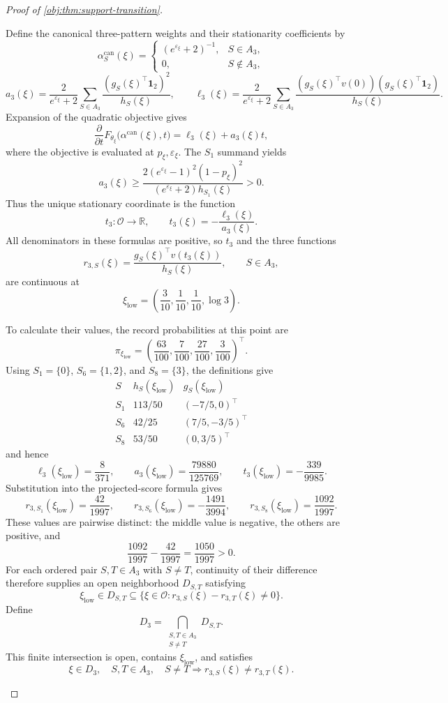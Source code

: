\begin{proof}[Proof of \cref{obj:thm:support-transition}]
\begin{enumerate}
Define the canonical three-pattern weights and their stationarity coefficients by
\[
\alpha^{\mathrm{can}}_S(\xi)=
\begin{cases}
(e^{\varepsilon_\xi}+2)^{-1},&S\in A_3,\\
0,&S\notin A_3,
\end{cases}
\]
\[
a_3(\xi)=\frac{2}{e^{\varepsilon_\xi}+2}
 \sum_{S\in A_3}\frac{(g_S(\xi)^\top\mathbf1_2)^2}{h_S(\xi)},
\qquad
\ell_3(\xi)=\frac{2}{e^{\varepsilon_\xi}+2}
 \sum_{S\in A_3}
 \frac{(g_S(\xi)^\top v(0))(g_S(\xi)^\top\mathbf1_2)}{h_S(\xi)}.
\]
Expansion of the quadratic objective gives
\[
\frac{\partial}{\partial t}
F_{\theta_\xi}\bigl(\alpha^{\mathrm{can}}(\xi),t\bigr)
=\ell_3(\xi)+a_3(\xi)t,
\]
where the objective is evaluated at \(p_\xi,\varepsilon_\xi\). The \(S_1\) summand yields
\[
a_3(\xi)\ge
\frac{2(e^{\varepsilon_\xi}-1)^2(1-p_\xi)^2}
 {(e^{\varepsilon_\xi}+2)h_{S_1}(\xi)}>0.
\]
Thus the unique stationary coordinate is the function
\[
t_3:\mathcal O\longrightarrow\mathbb R,
\qquad
t_3(\xi)=-\frac{\ell_3(\xi)}{a_3(\xi)}.
\]
All denominators in these formulas are positive, so \(t_3\) and the three functions
\[
r_{3,S}(\xi)=
\frac{g_S(\xi)^\top v(t_3(\xi))}{h_S(\xi)},
\qquad S\in A_3,
\]
are continuous at
\[
\xi_{\mathrm{low}}
=\left(\frac3{10},\frac1{10},\frac1{10},\log 3\right).
\]

To calculate their values, the record probabilities at this point are
\[
\pi_{\xi_{\mathrm{low}}}
=\left(\frac{63}{100},\frac7{100},\frac{27}{100},\frac3{100}\right)^\top.
\]
Using \(S_1=\{0\}\), \(S_6=\{1,2\}\), and \(S_8=\{3\}\), the definitions give
\[
\begin{array}{c|c|c}
S&h_S(\xi_{\mathrm{low}})&g_S(\xi_{\mathrm{low}})\\ \hline
S_1&113/50&(-7/5,0)^\top\\
S_6&42/25&(7/5,-3/5)^\top\\
S_8&53/50&(0,3/5)^\top
\end{array}
\]
and hence
\[
\ell_3(\xi_{\mathrm{low}})=\frac8{371},
\qquad
a_3(\xi_{\mathrm{low}})=\frac{79880}{125769},
\qquad
t_3(\xi_{\mathrm{low}})=-\frac{339}{9985}.
\]
Substitution into the projected-score formula gives
\[
r_{3,S_1}(\xi_{\mathrm{low}})=\frac{42}{1997},
\qquad
r_{3,S_6}(\xi_{\mathrm{low}})=-\frac{1491}{3994},
\qquad
r_{3,S_8}(\xi_{\mathrm{low}})=\frac{1092}{1997}.
\]
These values are pairwise distinct: the middle value is negative, the others are positive, and
\[
\frac{1092}{1997}-\frac{42}{1997}=\frac{1050}{1997}>0.
\]
For each ordered pair \(S,T\in A_3\) with \(S\ne T\), continuity of their difference therefore supplies an open neighborhood \(D_{S,T}\) satisfying
\[
\xi_{\mathrm{low}}\in D_{S,T}
\subseteq
\{\xi\in\mathcal O:r_{3,S}(\xi)-r_{3,T}(\xi)\ne0\}.
\]
Define
\[
D_3=\bigcap_{\substack{S,T\in A_3\\S\ne T}}D_{S,T}.
\]
This finite intersection is open, contains \(\xi_{\mathrm{low}}\), and satisfies
\[
\xi\in D_3,\quad S,T\in A_3,\quad S\ne T
\Longrightarrow r_{3,S}(\xi)\ne r_{3,T}(\xi).
\]


\end{enumerate}
\end{proof}
